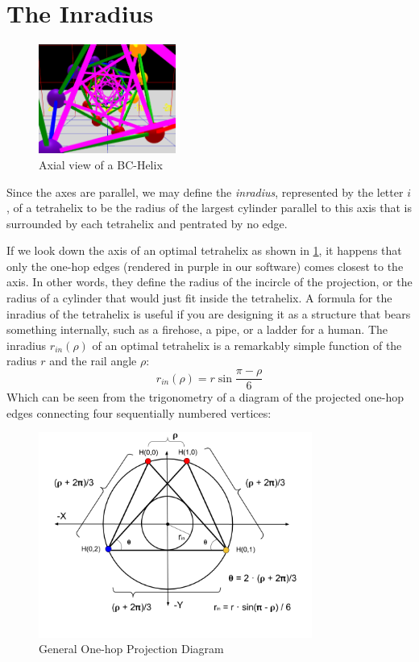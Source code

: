 \documentclass[review]{siamonline1116}
\begin{document}
\section{The Inradius}

\begin{figure}[H]
     \centering
     \includegraphics[width=0.4\textwidth]{figures/AxialView.png}
     \caption{Axial view of a BC-Helix}
  \label{axialview}     
\end{figure}

Since the axes are parallel, we may define the \emph{inradius}, represented by the letter $i$, of a
tetrahelix to be the radius of the largest
cylinder parallel to this axis that is surrounded by each tetrahelix and pentrated by no edge.


If we look down the axis of an optimal tetrahelix as shown in \cref{axialview}, it happens that only
the one-hop edges
(rendered in purple in our software)
comes closest to the axis. In other words, they define the radius of the incircle of the
projection, or the radius of a cylinder that would just fit inside the tetrahelix.
A formula for the inradius of the tetrahelix is useful if you are designing it as a structure that bears something internally,
such as a firehose, a pipe, or
a ladder for a human. The inradius $r_{in}(\rho)$ of
an optimal tetrahelix is a remarkably simple function of the radius $r$ and the rail angle $\rho$:
\begin{equation}
  \label{eq:inradius}
  r_{in}(\rho) = r \sin{\frac{\pi - \rho}{6}}
\end{equation}
Which can be seen from the trigonometry of a diagram of the projected one-hop edges
connecting four sequentially numbered vertices:

\begin{figure}[H]
     \centering
     \includegraphics[width=0.8\textwidth]{figures/ProjectionDiagram.png}
     \caption{General One-hop Projection Diagram}
  \label{projectiondiagram}
     
\end{figure}
\end{document}
